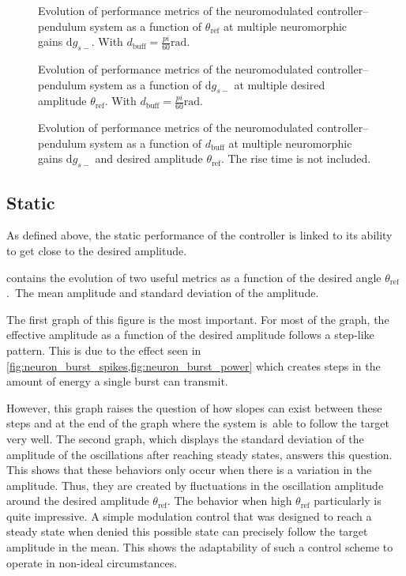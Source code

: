 \begin{figure}[!htbp]
    \centering
    \caption{Evolution of performance metrics of the neuromodulated controller–pendulum system as a function of $\theta_\text{ref}$ at multiple neuromorphic gains $\mathrm{d}g_{s-}$. With $d_\text{buff} = \frac{pi}{60}\unit{\radian}$.}
    \label{fig:neuromod_tgt}
\end{figure}

\begin{figure}[!htbp]
    \centering
    \caption{Evolution of performance metrics of the neuromodulated controller–pendulum system as a function of $\mathrm{d}g_{s-}$ at multiple desired amplitude $\theta_\text{ref}$. With $d_\text{buff} = \frac{pi}{60}\unit{\radian}$.}
    \label{fig:neuromod_gain}
\end{figure}

\begin{figure}[!htbp]
    \centering
    \caption{Evolution of performance metrics of the neuromodulated controller–pendulum system as a function of $d_\text{buff}$ at multiple neuromorphic gains $\mathrm{d}g_{s-}$ and desired amplitude $\theta_\text{ref}$. The rise time is not included.}
    \label{fig:neuromod_buff}
\end{figure}

\subsection{Static}

As defined above, the static performance of the controller is linked to its ability to get close to the desired amplitude.

 contains the evolution of two useful metrics as a function of the desired angle $\theta_\text{ref}$. The mean amplitude and standard deviation of the amplitude.

The first graph of this figure is the most important.
For most of the graph, the effective amplitude as a function of the desired amplitude follows a step-like pattern. This is due to the effect seen in \cref{fig:neuron_burst_spikes,fig:neuron_burst_power} which creates steps in the amount of energy a single burst can transmit.

However, this graph raises the question of how slopes can exist between these steps and at the end of the graph where the system is able to follow the target very well.
The second graph, which displays the standard deviation of the amplitude of the oscillations after reaching steady states, answers this question.
This shows that these behaviors only occur when there is a variation in the amplitude.
Thus, they are created by fluctuations in the oscillation amplitude around the desired amplitude $\theta_\text{ref}$.
The behavior when high $\theta_\text{ref}$ particularly is quite impressive.
A simple modulation control that was designed to reach a steady state when denied this possible state can precisely follow the target amplitude in the mean.
This shows the adaptability of such a control scheme to operate in non-ideal circumstances.

